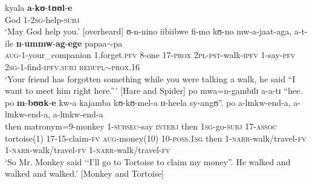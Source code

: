 \begin{exe}
\ex \label{exSUBJvolitive1}
\gll kyala \textbf{a}-\textbf{kʊ}-\textbf{tʊʊl}-\textbf{e}\\
God 1-\textsc{2sg}-help-\textsc{subj}\\
\glt `May God help you.' [overheard]
\ex \label{exSUBJvolitive2}
\gll ʊ-n-nino iibiibwe fi-mo kʊ-no mw-a-jaat-aga, a-t-ile \textbf{n}-\textbf{ummw}-\textbf{ag}-\textbf{ege} papaa$\sim$pa\\
\textsc{aug}-1-your\_companion \textsc{1}.forget.\textsc{pfv} 8-one 17-\textsc{prox} \textsc{2pl}-\textsc{pst}-walk-\textsc{ipfv} 1-say-\textsc{pfv} \textsc{2sg}-1-find-\textsc{ipfv.subj} \textsc{redupl}$\sim$\textsc{prox.16}\\
\glt `Your friend has forgotten something while you were talking a walk, he said ``I want to meet him right here.''{}' [Hare and Spider]
\ex \label{exSUBJannounce}
\gll po mwa=n-gambɪlɪ a-a-tɪ ``hee. po \textbf{m}-\textbf{bʊʊk}-\textbf{e} kw-a kajamba kʊ-kʊ-mel-a ɪɪ-heela sy-angʊ''. po a-lɪnkw-end-a,  a-lɪnkw-end-a,  a-lɪnkw-end-a\\
then matronym=9-monkey 1-\textsc{subsec}-say \phantom{\lq\lq}\textsc{interj} then \textsc{1sg}-go-\textsc{subj} 17-\textsc{assoc} tortoise(1) 17-15-claim-\textsc{fv} \textsc{aug}-money(10) 10-\textsc{poss.1sg} then 1-\textsc{narr}-walk/travel-\textsc{fv} 1-\textsc{narr}-walk/travel-\textsc{fv} 1-\textsc{narr}-walk/travel-\textsc{fv}\\
\glt `So Mr. Monkey said \textup{\lq\lq}I'll go to Tortoise to claim my money\textup{''}. He walked and walked and walked.' [Monkey and Tortoise] 
\end{exe}

